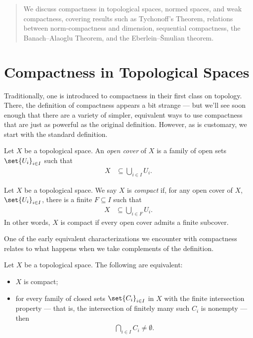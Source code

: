 \documentclass[10pt]{mypackage}
\begin{document}
\RaggedRight
\begin{abstract}
  \noindent We discuss compactness in topological spaces, normed spaces, and weak compactness, covering results such as Tychonoff's Theorem, relations between norm-compactness and dimension, sequential compactness, the Banach--Alaoglu Theorem, and the Eberlein--\v{S}mulian theorem.
\end{abstract}
\section{Compactness in Topological Spaces}%
Traditionally, one is introduced to compactness in their first class on topology. There, the definition of compactness appears a bit strange --- but we'll see soon enough that there are a variety of simpler, equivalent ways to use compactness that are just as powerful as the original definition. However, as is customary, we start with the standard definition.
\begin{definition}
  Let $X$ be a topological space. An \textit{open cover} of $X$ is a family of open sets $\set{U_i}_{i\in I}$ such that
  \begin{align*}
    X &\subseteq \bigcup_{i\in I}U_i.
  \end{align*}
\end{definition}
\begin{definition}
  Let $X$ be a topological space. We say $X$ is \textit{compact} if, for any open cover of $X$, $\set{U_i}_{i\in I}$, there is a finite $F\subseteq I$ such that
  \begin{align*}
    X &\subseteq \bigcup_{i\in F}U_i.
  \end{align*}
  In other words, $X$ is compact if every open cover admits a finite subcover.
\end{definition}
One of the early equivalent characterizations we encounter with compactness relates to what happens when we take complements of the definition.
\begin{theorem}
  Let $X$ be a topological space. The following are equivalent:
  \begin{itemize}
    \item $X$ is compact;
    \item for every family of closed sets $\set{C_i}_{i\in I}$ in $X$ with the finite intersection property --- that is, the intersection of finitely many such $C_i$ is nonempty --- then 
      \begin{align*}
        \bigcap_{i\in I}C_i\neq \emptyset.
      \end{align*}
  \end{itemize}
\end{theorem}
\end{document}
